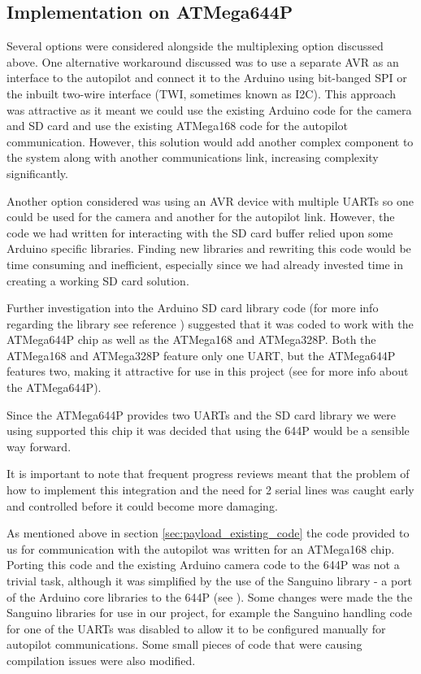 \subsection{Implementation on ATMega644P}
\label{sec:atmega644p_impl}
Several options were considered alongside the multiplexing option discussed above. One alternative workaround discussed was to use a separate AVR as an interface to the autopilot and connect it to the Arduino using bit-banged SPI or the inbuilt two-wire interface (TWI, sometimes known as I2C). This approach was 
attractive as it meant we could use the existing Arduino code for the camera 
and SD card and use the existing ATMega168 code for the autopilot communication.
However, this solution would add another complex component to the system along
with another communications link, increasing complexity significantly.

Another option considered was using an AVR device with multiple UARTs so one 
could be used for the camera and another for the autopilot link. However, 
the code we had written for interacting with the SD card buffer relied upon 
some Arduino specific libraries. Finding new libraries and rewriting this code 
would be time consuming and inefficient, especially since we had already 
invested time in creating a working SD card solution.

Further investigation into the Arduino SD card library code (for more info
regarding the library see reference \cite{arduino_sd_library}) suggested that
it was coded to work with the ATMega644P chip as well as the ATMega168 and
ATMega328P. Both the ATMega168 and ATMega328P feature only one UART, but the 
ATMega644P features two, making it attractive for use in this project (see
\cite{atmega644p} for more info about the ATMega644P).

Since the ATMega644P provides two UARTs and the SD card library we were using
supported this chip it was decided that using the 644P would be a sensible 
way forward. 

It is important to note that frequent progress reviews meant that the problem of how to implement this integration and the need for 2 serial lines was caught early and controlled before it could become more damaging.

As mentioned above in section \ref{sec:payload_existing_code} the code provided
to us for communication with the autopilot was written for an ATMega168 chip. 
Porting this code and the existing Arduino camera code to the 644P was not a 
trivial task, although it was simplified by the use of the Sanguino library -
a port of the Arduino core libraries to the 644P (see \cite{sanguino}). Some 
changes were made the the Sanguino libraries for use in our project, for 
example the Sanguino handling code for one of the UARTs was disabled to allow
it to be configured manually for autopilot communications. Some small pieces
of code that were causing compilation issues were also modified.

